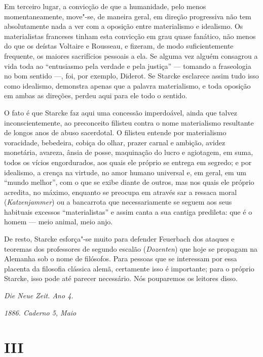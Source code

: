 Em terceiro lugar, a convicção de que a humanidade, pelo menos
momentaneamente, move"-se, de maneira geral, em direção progressiva não
tem absolutamente nada a ver com a oposição entre materialismo e
idealismo. Os materialistas franceses tinham esta convicção em grau
quase fanático, não menos do que os
deístas Voltaire e Rousseau,
e fizeram, de modo suficientemente frequente, os maiores sacrifícios
pessoais a ela. Se alguma vez alguém consagrou a vida toda ao
``entusiasmo pela verdade e pela justiça'' --- tomando a fraseologia no
bom sentido ---, foi, por
exemplo, Diderot. Se Starcke esclarece
assim tudo isso como idealismo, demonstra apenas que a palavra
materialismo, e toda oposição em ambas as direções, perdeu aqui para ele
todo o sentido.

O fato é que Starcke faz aqui uma concessão imperdoável, ainda que
talvez inconscientemente, ao preconceito filisteu contra o nome
materialismo resultante de longos anos de abuso sacerdotal. O filisteu
entende por materialismo voracidade, bebedeira, cobiça do olhar, prazer
carnal e ambição, avidez monetária, avareza, ânsia de posse, maquinação
do lucro e agiotagem, em suma, todos os vícios engordurados, aos quais
ele próprio se entrega em segredo; e por idealismo, a crença na virtude,
no amor humano universal e, em geral, em um ``mundo melhor'', com o que
se exibe diante de outros, mas nos quais ele próprio acredita, no
máximo, enquanto se preocupa em através sar a ressaca moral
(\emph{Katzenjammer}) ou a bancarrota que necessariamente se seguem aos
seus habituais excessos ``materialistas'' e assim canta a sua cantiga
predileta: que é o homem --- meio animal, meio anjo.

De resto, Starcke esforça"-se muito para
defender Feuerbach dos
ataques e teoremas dos professores de segundo escalão (\emph{Dozenten})
que hoje se propagam na Alemanha sob o nome de filósofos. Para pessoas
que se interessam por essa placenta da filosofia clássica alemã,
certamente isso é importante; para o próprio Starcke, isso pode até
parecer necessário. Nós pouparemos os leitores disso.

\pagebreak

\hfill\emph{Die Neue Zeit. Ano 4.}

\hfill\emph{1886. Caderno 5, Maio}

\bigskip

\section{III}


